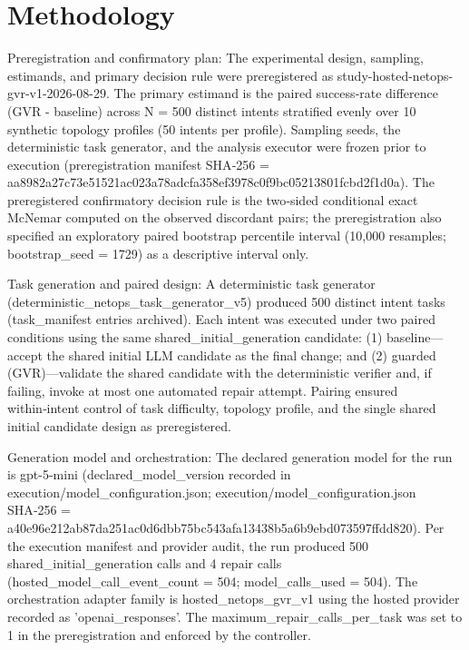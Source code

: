 \documentclass[conference]{IEEEtran}
\begin{document}
\section{Methodology}
Preregistration and confirmatory plan: The experimental design, sampling, estimands, and primary decision rule were preregistered as study-hosted-netops-gvr-v1-2026-08-29. The primary estimand is the paired success‑rate difference (GVR - baseline) across N = 500 distinct intents stratified evenly over 10 synthetic topology profiles (50 intents per profile). Sampling seeds, the deterministic task generator, and the analysis executor were frozen prior to execution (preregistration manifest SHA‑256 = aa8982a2\allowbreak{}7c73e515\allowbreak{}21ac023a\allowbreak{}78adcfa3\allowbreak{}58ef3978\allowbreak{}c0f9bc05\allowbreak{}213801fc\allowbreak{}bd2f1d0a). The preregistered confirmatory decision rule is the two‑sided conditional exact McNemar computed on the observed discordant pairs; the preregistration also specified an exploratory paired bootstrap percentile interval (10,000 resamples; bootstrap\_seed = 1729) as a descriptive interval only.

Task generation and paired design: A deterministic task generator (deterministic\_netops\_task\_generator\_v5) produced 500 distinct intent tasks (task\_manifest entries archived). Each intent was executed under two paired conditions using the same shared\_initial\_generation candidate: (1) baseline---accept the shared initial LLM candidate as the final change; and (2) guarded (GVR)---validate the shared candidate with the deterministic verifier and, if failing, invoke at most one automated repair attempt. Pairing ensured within‑intent control of task difficulty, topology profile, and the single shared initial candidate design as preregistered.

Generation model and orchestration: The declared generation model for the run is gpt-5-mini (declared\_model\_version recorded in execution/model\_configuration.json; execution/model\_configuration.json SHA‑256 = a40e96e2\allowbreak{}12ab87da\allowbreak{}251ac0d6\allowbreak{}dbb75bc5\allowbreak{}43afa134\allowbreak{}38b5a6b9\allowbreak{}ebd07359\allowbreak{}7ffdd820). Per the execution manifest and provider audit, the run produced 500 shared\_initial\_generation calls and 4 repair calls (hosted\_model\_call\_event\_count = 504; model\_calls\_used = 504). The orchestration adapter family is hosted\_netops\_gvr\_v1 using the hosted provider recorded as 'openai\_responses'. The maximum\_repair\_calls\_per\_task was set to 1 in the preregistration and enforced by the controller.
\end{document}
